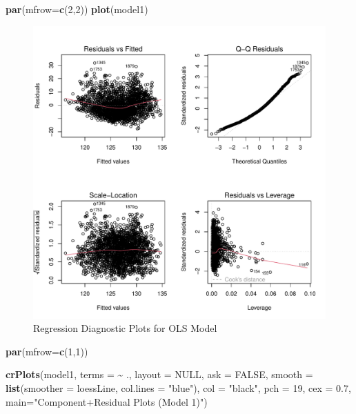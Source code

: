 \documentclass[
]{article}
\newenvironment{Shaded}{\begin{snugshade}}{\end{snugshade}}
\newcommand{\AttributeTok}[1]{\textcolor[rgb]{0.13,0.29,0.53}{#1}}
\newcommand{\ConstantTok}[1]{\textcolor[rgb]{0.56,0.35,0.01}{#1}}
\newcommand{\DecValTok}[1]{\textcolor[rgb]{0.00,0.00,0.81}{#1}}
\newcommand{\FloatTok}[1]{\textcolor[rgb]{0.00,0.00,0.81}{#1}}
\newcommand{\FunctionTok}[1]{\textcolor[rgb]{0.13,0.29,0.53}{\textbf{#1}}}
\newcommand{\NormalTok}[1]{#1}
\newcommand{\SpecialCharTok}[1]{\textcolor[rgb]{0.81,0.36,0.00}{\textbf{#1}}}
\newcommand{\StringTok}[1]{\textcolor[rgb]{0.31,0.60,0.02}{#1}}
\begin{document}
\begin{Shaded}
\begin{Highlighting}[]
  \FunctionTok{par}\NormalTok{(}\AttributeTok{mfrow=}\FunctionTok{c}\NormalTok{(}\DecValTok{2}\NormalTok{,}\DecValTok{2}\NormalTok{)) }
  \FunctionTok{plot}\NormalTok{(model1) }
\end{Highlighting}
\end{Shaded}

\begin{figure}
\centering
\includegraphics{FinalProject_files/figure-latex/model1-diagnostics-1.pdf}
\caption{Regression Diagnostic Plots for OLS Model}
\end{figure}

\begin{Shaded}
\begin{Highlighting}[]
  \FunctionTok{par}\NormalTok{(}\AttributeTok{mfrow=}\FunctionTok{c}\NormalTok{(}\DecValTok{1}\NormalTok{,}\DecValTok{1}\NormalTok{))}
  
  \FunctionTok{crPlots}\NormalTok{(model1, }
        \AttributeTok{terms =} \SpecialCharTok{\textasciitilde{}}\NormalTok{ ., }
        \AttributeTok{layout =} \ConstantTok{NULL}\NormalTok{, }
        \AttributeTok{ask =} \ConstantTok{FALSE}\NormalTok{, }
        \AttributeTok{smooth =} \FunctionTok{list}\NormalTok{(}\AttributeTok{smoother =}\NormalTok{ loessLine, }\AttributeTok{col.lines =} \StringTok{"blue"}\NormalTok{),}
        \AttributeTok{col =} \StringTok{"black"}\NormalTok{,}
        \AttributeTok{pch =} \DecValTok{19}\NormalTok{,      }
        \AttributeTok{cex =} \FloatTok{0.7}\NormalTok{,}
        \AttributeTok{main=}\StringTok{"Component+Residual Plots (Model 1)"}\NormalTok{)     }
\end{Highlighting}
\end{Shaded}
\end{document}
